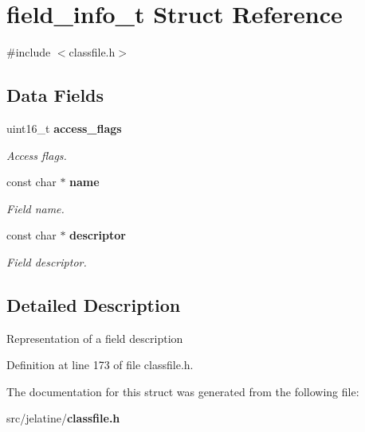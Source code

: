 \section{field\_\-info\_\-t Struct Reference}
\label{structfield__info__t}


{\ttfamily \#include $<$classfile.h$>$}

\subsection*{Data Fields}
\begin{DoxyCompactItemize}
\item 
uint16\_\-t {\bf access\_\-flags}\label{structfield__info__t_a2c7f37c55a4b344a1754e9a3e70b7c6a}

\begin{DoxyCompactList}\small\item\em Access flags. \item\end{DoxyCompactList}\item 
const char $\ast$ {\bf name}\label{structfield__info__t_a71fcd6f4559d5e3d5dde4e0387ec5454}

\begin{DoxyCompactList}\small\item\em Field name. \item\end{DoxyCompactList}\item 
const char $\ast$ {\bf descriptor}\label{structfield__info__t_ae7b47d9a71c3fc4a7b1044bbbc8c43eb}

\begin{DoxyCompactList}\small\item\em Field descriptor. \item\end{DoxyCompactList}\end{DoxyCompactItemize}


\subsection{Detailed Description}
Representation of a field description 

Definition at line 173 of file classfile.h.



The documentation for this struct was generated from the following file:\begin{DoxyCompactItemize}
\item 
src/jelatine/{\bf classfile.h}\end{DoxyCompactItemize}
